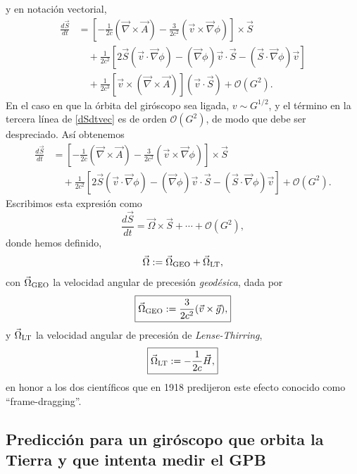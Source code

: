 y en notación vectorial,
\begin{align}\label{dSdtvec}
\frac{d\vec{S}}{dt} &= \left[-\frac{1}{2c}(\vec{\nabla}\times\vec{A})-\frac{3}{2c^2}(\vec{v}\times\vec{\nabla}\phi)\right]\times\vec{S} \nonumber \\
 &\quad +\frac{1}{2c^2}\left[2\vec{S}(\vec{v}\cdot\vec{\nabla}\phi)-(\vec{\nabla}\phi)\vec{v}\cdot\vec{S}-(\vec{S}\cdot\vec\nabla\phi)\vec{v}\right] \nonumber\\
 &\quad + \frac{1}{2c^3}[\vec{v}\times(\vec{\nabla}\times\vec{A})](\vec{v}\cdot\vec{S})+\mathcal{O}(G^2).
\end{align}
En el caso en que la órbita del giróscopo sea ligada, $v\sim G^{1/2}$, y el término en la tercera línea de \eqref{dSdtvec} es de orden $\mathcal{O}(G^2)$, de modo que debe ser despreciado. Así obtenemos
\begin{align}\label{dSdtvecfinal}
\frac{d\vec{S}}{dt} &= \left[-\frac{1}{2c}(\vec{\nabla}\times\vec{A})-\frac{3}{2c^2}(\vec{v}\times\vec{\nabla}\phi)\right]\times\vec{S} \nonumber \\
 &\quad +\frac{1}{2c^2}\left[2\vec{S}(\vec{v}\cdot\vec{\nabla}\phi)-(\vec{\nabla}\phi)\vec{v}\cdot\vec{S}-(\vec{S}\cdot\vec\nabla\phi)\vec{v}\right] +\mathcal{O}(G^2).
\end{align}
Escribimos esta expresión como
\begin{equation}
\frac{d\vec{S}}{dt}=\vec{\Omega}\times\vec{S}+\cdots + \mathcal{O}(G^2),
\end{equation}
donde hemos definido,
\begin{equation}
\vec{\Omega}:=\vec{\Omega}_{\rm GEO}+\vec{\Omega}_{\rm LT},
\end{equation}
con $\vec{\Omega}_{\rm GEO}$ la velocidad angular de precesión \emph{geodésica}, dada por
\begin{align}\boxed{
\vec{\Omega}_{\rm GEO}:=\frac{3}{2c^2}(\vec{v}\times\vec{g}),}\label{geodetic}
\end{align}
y $\vec{\Omega}_{\rm LT}$ la velocidad angular de precesión de \emph{Lense-Thirring}, 
\begin{align}\boxed{
\vec{\Omega}_{\rm LT}:=-\frac{1}{2c}\vec{H},}\label{LT}
\end{align}
en honor a los dos científicos que en 1918 predijeron este efecto conocido como ``frame-dragging''.


\subsection{Predicción para un giróscopo que orbita la Tierra y que intenta medir el GPB}

